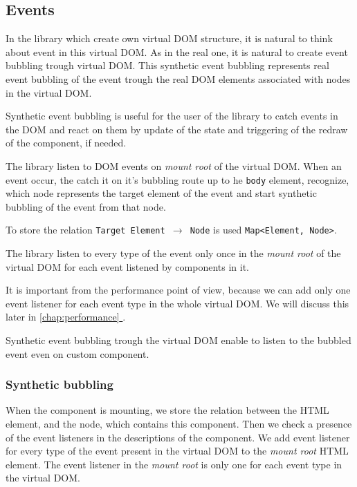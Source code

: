 \documentclass[oneside, 12pt]{book}
\newcommand*{\fullref}[1]{\hyperref[{#1}]{\autoref*{#1} \nameref*{#1}}}
\begin{document}
  \subsection{Events}\label{subsec:our-architecture-events}

    In the library which create own virtual DOM structure, it is natural to think about event in this virtual DOM. 
    As in the real one, it is natural to create event bubbling trough virtual DOM. 
    This synthetic event bubbling represents real event bubbling of the event 
    trough the real DOM elements associated with nodes in the virtual DOM.

    Synthetic event bubbling is useful for the user of the library to catch events in the DOM and react on them by update of the state 
    and triggering of the redraw of the component, if needed. 

    The \tiles library listen to DOM events on \textit{mount root} of the virtual DOM.
    When an event occur, the \tiles catch it on it's bubbling route up to he \texttt{body} element, 
    recognize, which node represents the target element of the event and start synthetic bubbling of the event from that node. 

    To store the relation \mbox{\texttt{Target Element $\rightarrow$ Node}} is used \texttt{Map<Element, Node>}.

    The \tiles library listen to every type of the event only once in the \textit{mount root} 
    of the virtual DOM for each event listened by components in it.

    It is important from the performance point of view, because we can add only one event listener for each event type in the whole virtual DOM.
    We will discuss this later in \fullref{chap:performance}.

    Synthetic event bubbling trough the virtual DOM enable to listen to the bubbled event even on custom component.

    \subsubsection{Synthetic bubbling}\label{subsec:our-architecture-events-bubbling}

      When the component is mounting, we store the relation between the HTML element, and the node, which contains this component. 
      Then we check a presence of the event listeners in the descriptions of the component. 
      We add event listener for every type of the event present in the virtual DOM to the \textit{mount root} HTML element. 
      The event listener in the \textit{mount root} is only one for each event type in the virtual DOM.
\end{document}
